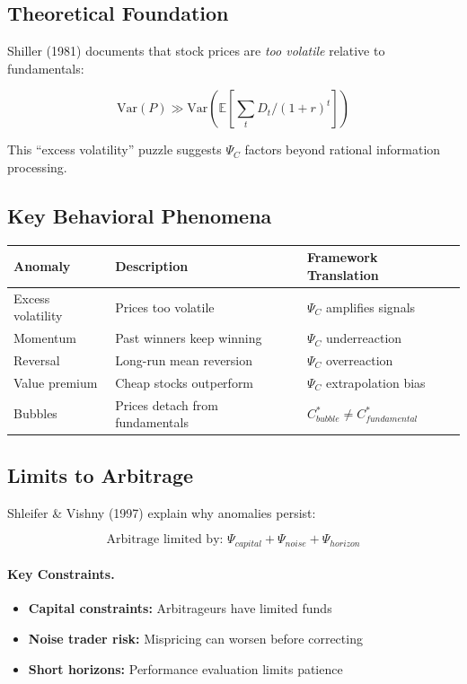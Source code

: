 \subsection{Theoretical Foundation}

Shiller (1981) documents that stock prices are \textit{too volatile} relative
to fundamentals:

\begin{equation}
\boxed{
\text{Var}(P) \gg \text{Var}(\mathbb{E}[\sum_t D_t / (1+r)^t])
}
\label{eq:excess-volatility}
\end{equation}

This ``excess volatility'' puzzle suggests $\Psi_C$ factors beyond rational
information processing.

\subsection{Key Behavioral Phenomena}

\begin{center}
\renewcommand{\arraystretch}{1.3}
\begin{tabular}{|l|l|l|}
\hline
\textbf{Anomaly} & \textbf{Description} & \textbf{Framework Translation} \\
\hline
Excess volatility & Prices too volatile & $\Psi_C$ amplifies signals \\
Momentum & Past winners keep winning & $\Psi_C$ underreaction \\
Reversal & Long-run mean reversion & $\Psi_C$ overreaction \\
Value premium & Cheap stocks outperform & $\Psi_C$ extrapolation bias \\
Bubbles & Prices detach from fundamentals & $C^*_{bubble} \neq C^*_{fundamental}$ \\
\hline
\end{tabular}
\end{center}

\subsection{Limits to Arbitrage}

Shleifer \& Vishny (1997) explain why anomalies persist:

\begin{equation}
\boxed{
\text{Arbitrage limited by: } \Psi_{capital} + \Psi_{noise} + \Psi_{horizon}
}
\label{eq:limits-arb}
\end{equation}

\paragraph{Key Constraints.}
\begin{itemize}
    \item \textbf{Capital constraints:} Arbitrageurs have limited funds
    \item \textbf{Noise trader risk:} Mispricing can worsen before correcting
    \item \textbf{Short horizons:} Performance evaluation limits patience
\end{itemize}

